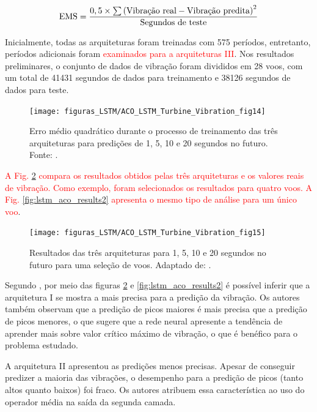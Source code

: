 \begin{equation}
 \label{eq:erroMSE}
 \textnormal{EMS} = \frac{0,5 \times \sum\left( \textnormal{Vibração real} - \textnormal{Vibração predita} \right)^2}{\textnormal{Segundos de teste}}
 \end{equation}
 
 Inicialmente, todas as arquiteturas foram treinadas com 575 períodos, entretanto, períodos adicionais foram \textcolor{red}{examinados para a arquiteturas III}. Nos resultados preliminares, o conjunto de dados de vibração foram divididos em 28 voos, com um total de 41431 segundos de dados para treinamento e 38126 segundos de dados para teste.

\begin{figure}[H]
	\centering
	{\texttt{[image: figuras\_LSTM/ACO\_LSTM\_Turbine\_Vibration\_fig14]}}
	\caption{Erro médio quadrático durante o processo de treinamento das três arquiteturas para predições de 1, 5, 10 e 20 segundos no futuro. Fonte: .}
	\label{fig:lstm_aco_ems}
\end{figure}

\textcolor{red}{A Fig. \ref{fig:lstm_aco_results1} compara os resultados obtidos pelas três arquiteturas e os valores reais de vibração. Como exemplo, foram selecionados os resultados para quatro voos. A Fig. \ref{fig:lstm_aco_results2} apresenta o mesmo tipo de análise para um único voo}.

\begin{figure}[H]
	\centering
	{\texttt{[image: figuras\_LSTM/ACO\_LSTM\_Turbine\_Vibration\_fig15]}}	
	\caption{Resultados das três arquiteturas para 1, 5, 10 e 20 segundos no futuro para uma seleção de voos. Adaptado de: .}
	\label{fig:lstm_aco_results1}
\end{figure}

Segundo , por meio das figuras \ref{fig:lstm_aco_results1} e \ref{fig:lstm_aco_results2} é possível inferir que a arquitetura I se mostra a mais precisa para a predição da vibração. Os autores também observam que a predição de picos maiores é mais precisa que a predição de picos menores, o que sugere que a rede neural apresente a tendência de aprender mais sobre valor crítico máximo de vibração, o que é benéfico para o problema estudado.

A arquitetura II apresentou as predições menos precisas. Apesar de conseguir predizer a maioria das vibrações, o desempenho para a predição de picos (tanto altos quanto baixos) foi fraco. Os autores atribuem essa característica ao uso do operador média na saída da segunda camada.

